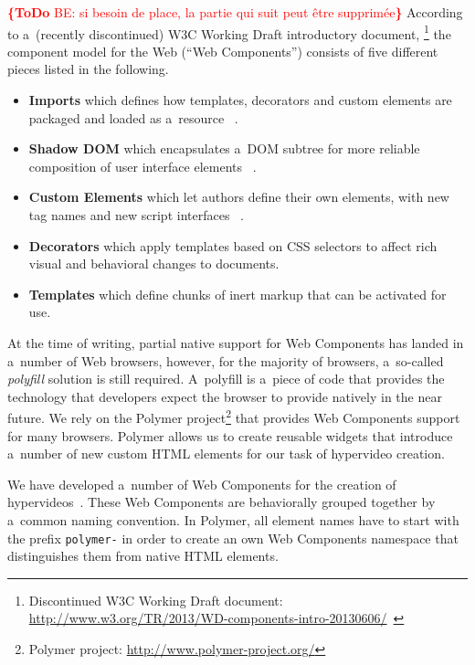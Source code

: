 \documentclass[conference]{IEEEtran}
\newcommand{\todo}[1]{\noindent\textcolor{red}{{\bf \{ToDo} #1{\bf \}}}}
\begin{document}
\todo{BE: si besoin de place, la partie qui suit peut être supprimée}
According to a~(recently discontinued) W3C Working Draft introductory document,%
\footnote{Discontinued W3C Working Draft document:
\url{http://www.w3.org/TR/2013/WD-components-intro-20130606/}~\cite{cooney2013Webcomponents}}
the component model for the Web (``Web Components'') consists of five different pieces
listed in the following.

\begin{itemize}
  \item \textbf{Imports} which defines how templates, decorators and custom elements are packaged and loaded as a~resource%
  ~\cite{glazkov2014htmlimports}.
  \item \textbf{Shadow DOM} which encapsulates a~DOM subtree for more reliable composition of user interface elements%
  ~\cite{glazkov2014shadowdom}.    
  \item \textbf{Custom Elements} which let authors define their own elements, with new tag names and new script interfaces%
  ~\cite{glazkov2013customelements}.  
  \item \textbf{Decorators} which apply templates based on CSS selectors to affect rich visual and behavioral changes to documents.
  \item \textbf{Templates} which define chunks of inert markup that can be activated for use.  
\end{itemize}

\noindent At the time of writing, partial native support for Web Components
has landed in a~number of Web browsers,
however, for the majority of browsers,
a~so-called \emph{polyfill} solution is still required.
A~polyfill  is a~piece of code that provides the technology
that developers expect the browser to provide natively in the near future.
We rely on the Polymer project\footnote{Polymer project:
\url{http://www.polymer-project.org/}}
that provides Web Components support for many browsers.
Polymer allows us to create reusable widgets that introduce a~number of new
custom HTML elements for our task of hypervideo creation.

We have developed a~number of Web Components for the creation of hypervideos~\cite{steiner2014hypervideo}.
These Web Components are behaviorally grouped together
by a~common naming convention.
In Polymer, all element names have to start with the prefix \texttt{polymer-}
in order to create an own Web Components namespace
that distinguishes them from native HTML elements.
\end{document}
